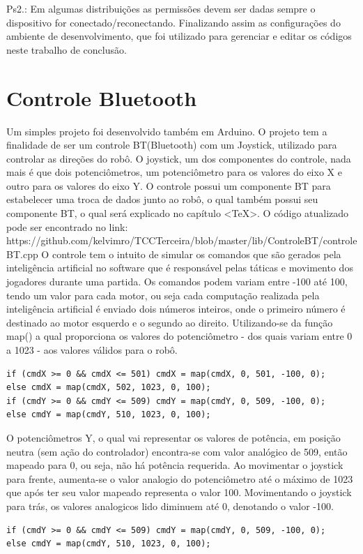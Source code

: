 \documentclass[a4paper,12pt,portuguese]{ufms-cpcx}
\begin{document}
Ps2.: Em algumas distribuições as permissões devem ser dadas sempre o dispositivo for conectado/reconectando.
Finalizando assim as configurações do ambiente de desenvolvimento, que foi utilizado para gerenciar e editar os códigos neste trabalho de conclusão.

\chapter{Controle Bluetooth}
Um simples projeto foi desenvolvido também em Arduino. O projeto tem a finalidade de ser um controle BT(Bluetooth) com um Joystick, utilizado para controlar as direções do robô. 
O joystick, um dos componentes do controle, nada mais é que dois potenciômetros, um potenciômetro para os valores do eixo X e outro para os valores do eixo Y. 
O controle possui um componente BT para estabelecer uma troca de dados junto ao robô, o qual também possui seu componente BT, o qual será explicado no capítulo <TeX>.
O código atualizado pode ser encontrado no link: https://github.com/kelvimro/TCCTerceira/blob/master/lib/ControleBT/controleBT.cpp 
O controle tem o intuito de simular os comandos que são gerados pela inteligência artificial no software que é responsável pelas táticas e movimento dos jogadores durante uma partida.
Os comandos podem variam entre -100 até 100, tendo um valor para cada motor, ou seja cada computação realizada pela inteligência artificial é enviado dois números inteiros, onde o primeiro número é destinado ao motor esquerdo e o segundo ao direito.
Utilizando-se da função map() a qual proporciona os valores do potenciômetro - dos quais variam entre 0 a 1023 - aos valores válidos para o robô.
\begin{lstlisting}
if (cmdX >= 0 && cmdX <= 501) cmdX = map(cmdX, 0, 501, -100, 0);
else cmdX = map(cmdX, 502, 1023, 0, 100);
if (cmdY >= 0 && cmdY <= 509) cmdY = map(cmdY, 0, 509, -100, 0);
else cmdY = map(cmdY, 510, 1023, 0, 100);
\end{lstlisting}
O potenciômetros Y, o qual vai representar os valores de potência, em posição neutra (sem ação do controlador) encontra-se com valor analógico de 509, então mapeado para 0, ou seja, não há potência requerida.
Ao movimentar o joystick para frente, aumenta-se o valor analogio do potenciômetro até o máximo de 1023 que após ter seu valor mapeado representa o valor 100.
Movimentando o joystick para trás, os valores analogicos lido diminuem até 0, denotando o valor -100. 
\begin{lstlisting}
if (cmdY >= 0 && cmdY <= 509) cmdY = map(cmdY, 0, 509, -100, 0);
else cmdY = map(cmdY, 510, 1023, 0, 100);
\end{lstlisting}
\end{document}
